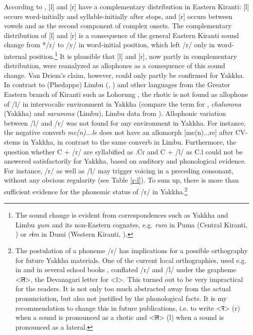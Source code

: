 According to  \cite{Driem1990The-fall}, [l] and [r] have a complementary distribution in Eastern Kiranti: [l] occurs word-initially and syllable-initially after stops, and [r] occurs between vowels and as the second component of complex onsets. The complementary distribution of [l] and [r] is a consequence of the general Eastern Kiranti sound change from */r/ to /y/ in word-initial position, which left /r/ only in word-internal position.\footnote{The sound change is evident from correspondences such as Yakkha and Limbu \emph{yum}  and its non-Eastern cognates, e.g. \emph{rum} in Puma (Central Kiranti, \citealt[393]{Bickeletal2009Puma}) or \emph{rɨm} in Dumi (Western Kiranti, \citealt[412]{Driem1993A-grammar}).} It is plausible that [l] and [r], now partly in complementary distribution, were reanalyzed as allophones as a consequence of this sound change.  Van Driem's claim, however, could only partly be confirmed for Yakkha. In contrast to (Phedappe) Limbu (\citealt{Driem1987A-grammar}, \citealt[688ff]{Schieringetal2010The-prosodic}) and other languages from the Greater Eastern branch of Kiranti such as Lohorung \citep[85]{Driem1990The-fall}, the rhotic is not found as allophone of /l/ in intervocalic environment in Yakkha (compare the term for , \emph{chalumma} (Yakkha) and \emph{sarumma} (Limbu), Limbu data from \citet[131]{Driem1985_LimbuKin}). Allophonic variation between /l/ and /r/ was not found for any environment in Yakkha. For instance, the negative converb \emph{me(n)...le} does not have an allomorph [me(n)...re] after CV-stems in Yakkha, in contrast to the same converb in Limbu. Furthermore, the question whether C + /r/ are syllabified as .Cr and C + /l/ as C.l could not be answered satisfactorily for Yakkha, based on auditory and phonological evidence. For instance, /r/ as well as /l/ may trigger voicing in a preceding consonant, without any obvious regularity (see Table \ref{r-l}). To sum up, there is more than sufficient evidence for the phonemic status of /r/ in Yakkha.\footnote{The postulation of a phoneme /r/ has implications for a possible orthography for future Yakkha materials. One of the current local orthographies, used e.g. in \citet{Kongren2007Yakkha} and in several school books \citep{Jimi2009Engka-Yakkha}, conflated /r/ and /l/ under the grapheme <{\Deva ल}>, the Devanagari letter for <l>. This turned out to be very impractical for the readers. It is not only too much abstracted away from the actual pronunciation, but also not justified by the phonological facts. It is my recommendation to change this in future publications, i.e. to write <{\Deva र}> (r) when a sound is pronounced as a rhotic and <{\Deva ल}> (l) when a sound is pronounced as a lateral.}




